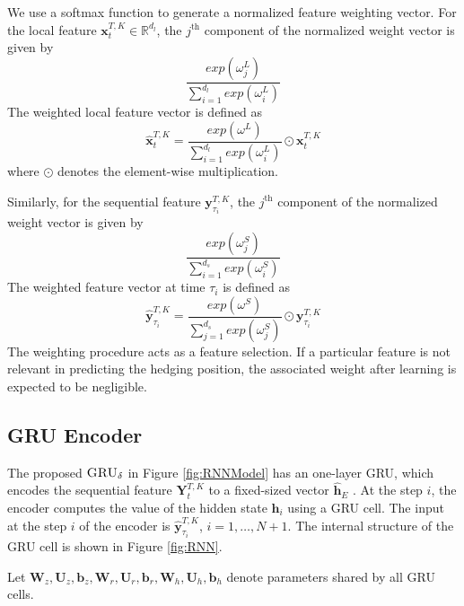 \documentclass[letterpaper,12pt,titlepage,oneside,final]{book}
\numberwithin{equation}{section}
\theoremstyle{definition}
\newcommand{\model}{\textsc{GRU}_\delta}
\newcommand{\vb}{\mathbf{b}}
\newcommand{\vx}{\mathbf{x}}
\newcommand{\vy}{\mathbf{y}}
\newcommand{\Real}{\mathbb{R}}
\newcommand{\vh}{\mathbf{h}}
\newcommand{\vW}{\pmb{W}}
\newcommand{\vU}{\pmb{U}}
\begin{document}
We  use a softmax function to generate a normalized  feature weighting vector. For the local feature $\vx^{T,K}_{t}  \in \Real^{d_l}$, the $j^\text{th}$ component of the normalized weight vector is given by
\[
\frac{exp(\omega^L_j)}{\sum_{i=1}^{d_l} exp(\omega^L_i)}
\]
The weighted  local feature vector is defined as
\[\widehat{\vx}^{T,K}_{t}=\frac{exp(\omega^L)}{\sum_{i=1}^{d_l} exp(\omega^L_i)}\odot \vx^{T,K}_{t} \] 
where $\odot$ denotes the element-wise multiplication.

Similarly,
for the sequential feature $\mathbf{y}_{\tau_i}^{T,K}$,  the $j^\text{th}$ component of the normalized weight vector is given by
\[
\frac{exp(\omega^S_j)}{\sum_{i=1}^{d_s} exp(\omega^S_i)}
\]
  The weighted feature vector at time  $\tau_i$ is defined as
\[
\widehat{\vy}_{\tau_i}^{T,K} =\frac{exp(\omega^S)}{\sum_{j=1}^{d_s} exp(\omega^S_j)} \odot \mathbf{y}_{\tau_i}^{T,K}
\]
{The weighting procedure acts as a feature selection.}
If a  particular feature is not relevant in predicting the hedging position, the associated weight after learning  is expected to be negligible.


\subsection{GRU Encoder}
The  proposed $\model$  in Figure \ref{fig:RNNModel} has an one-layer GRU, which encodes the sequential feature $\mathbf{Y}_{t}^{T,K}$ to  a fixed-sized vector
$\mathbf{\widehat{h}}_E$ .
At the  step $i$,  the encoder computes the value of the hidden state $\vh_{i}$ using a GRU cell. The input at the step $i$ of the encoder is $\widehat{\vy}^{T,K}_{\tau_{i}}$,  $i=1,\ldots,N+1$.
The internal structure of the GRU cell is shown in Figure \ref{fig:RNN}.

Let  $\vW_z,\vU_z,\vb_z,\vW_r,\vU_r, \vb_r,\vW_h,\vU_h,\vb_h$  denote
parameters shared by all GRU cells.
\end{document}
